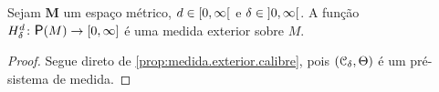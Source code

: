 \begin{proposition}
Sejam $\bm M$ um espaço métrico, $d \in \left[{0},{\infty}\right[$ e $\delta \in \left]{0},{\infty}\right[$. A função $H^d_\delta\colon \p(M) \to \intff{0}{\infty}$ é uma medida exterior sobre $M$.
\end{proposition}
\begin{proof}
Segue direto de \ref{prop:medida.exterior.calibre}, pois $(\mathcal C_\delta, \Theta)$ é um pré-sistema de medida.

\begin{comment}
	\begin{itemize}
	\item (Conjunto vazio) $H^d_\delta(\emptyset)=0$, pois se tomamos a cobertura vazia $(\emptyset)_{i \in \N}$, temos que $\emptyset \subseteq \bigcup_{i \in \N} \emptyset$ e $\diam(\emptyset)\leq \delta$;
	\item (Monotonicidade) Para todos $C,C' \subseteq M$ tais que $C \subseteq C'$, temos que uma $\delta$-cobertura de $C'$ é uma $\delta$-cobertura de $C$, logo $H^d_\delta(C) \leq H^d_\delta(C')$;
	\item (Subaditividade contável) Seja $(C_i)_{i \in \N}$ uma sequência de subconjuntos de $M$. Para todos $i \in \N$ e $\varepsilon \in \left]0,\infty\right[$, seja $U^i=(U_{i,j})_{j \in \N}$ é uma cobertura de $C_i$ tal que
		\begin{equation*}
		\sum_{j \in \N} \diam(U_{i,j})^d \leq H^d_\delta(C_i) + \frac{\varepsilon}{2^{i+1}}.
		\end{equation*}
	Essa cobertura existe porque $H^d_\delta(C_i)$ é um ínfimo. Então $(U_{i,j})_{(i,j) \in \N^2}$ é uma cobertura de $\bigcup_{i \in \N} C_i$ e segue que
		\begin{align*}
		H^d_\delta\left( \bigcup_{i \in \N} C_i \right) &\leq H^d_\delta\left( \bigcup_{(i,j) \in \N^2} U_{i,j} \right) \\
			&\leq \sum_{(i,j) \in \N^2} \diam(U_{i,j})^d \\
			&\leq \sum_{i \in \N} \left( H^d_\delta(C_i) + \frac{\varepsilon}{2^{i+1}} \right) \\
			&= \sum_{i \in \N} \left( H^d_\delta(C_i)\right) + \sum_{i \in \N}\frac{\varepsilon}{2^{i+1}} \\
			&= \sum_{i \in \N} \left( H^d_\delta(C_i)\right) + \varepsilon.
		\end{align*}
	A primeira desigualdade vem da monotonicidade de $H^d_\delta$, a segunda de $H^d_\delta$ ser ínfimo, e a terceira vem da condição para as coberturas $(U_{i,j})_{j \in \N}$. Como isso vale para qualquer $\varepsilon$, segue que
		\begin{equation*}
		H^d_\delta\left( \bigcup_{i \in \N} C_i \right) \leq \sum_{i \in \N} H^d_\delta(C_i). \qedhere
		\end{equation*}
	\end{itemize}
\end{comment}

\end{proof}


